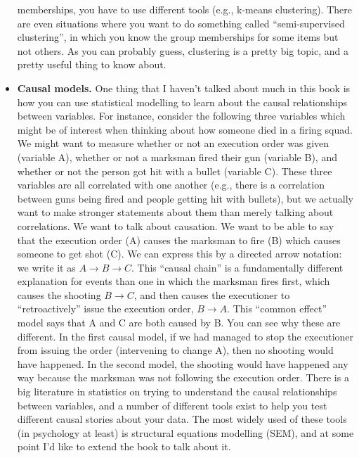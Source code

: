\documentclass[
  a4paper,
]{book}
\begin{document}
\begin{itemize}
  memberships, you have to use different tools (e.g., k-means
  clustering). There are even situations where you want to do something
  called ``semi-supervised clustering'', in which you know the group
  memberships for some items but not others. As you can probably guess,
  clustering is a pretty big topic, and a pretty useful thing to know
  about.
\item
  \textbf{Causal models.} One thing that I haven't talked about much in
  this book is how you can use statistical modelling to learn about the
  causal relationships between variables. For instance, consider the
  following three variables which might be of interest when thinking
  about how someone died in a firing squad. We might want to measure
  whether or not an execution order was given (variable A), whether or
  not a marksman fired their gun (variable B), and whether or not the
  person got hit with a bullet (variable C). These three variables are
  all correlated with one another (e.g., there is a correlation between
  guns being fired and people getting hit with bullets), but we actually
  want to make stronger statements about them than merely talking about
  correlations. We want to talk about causation. We want to be able to
  say that the execution order (A) causes the marksman to fire (B) which
  causes someone to get shot (C). We can express this by a directed
  arrow notation: we write it as \(A \rightarrow B \rightarrow C\). This
  ``causal chain'' is a fundamentally different explanation for events
  than one in which the marksman fires first, which causes the shooting
  \(B \rightarrow C\), and then causes the executioner to
  ``retroactively'' issue the execution order, \(B \rightarrow A\). This
  ``common effect'' model says that A and C are both caused by B. You
  can see why these are different. In the first causal model, if we had
  managed to stop the executioner from issuing the order (intervening to
  change A), then no shooting would have happened. In the second model,
  the shooting would have happened any way because the marksman was not
  following the execution order. There is a big literature in statistics
  on trying to understand the causal relationships between variables,
  and a number of different tools exist to help you test different
  causal stories about your data. The most widely used of these tools
  (in psychology at least) is structural equations modelling (SEM), and
  at some point I'd like to extend the book to talk about it.
\end{itemize}
\end{document}
